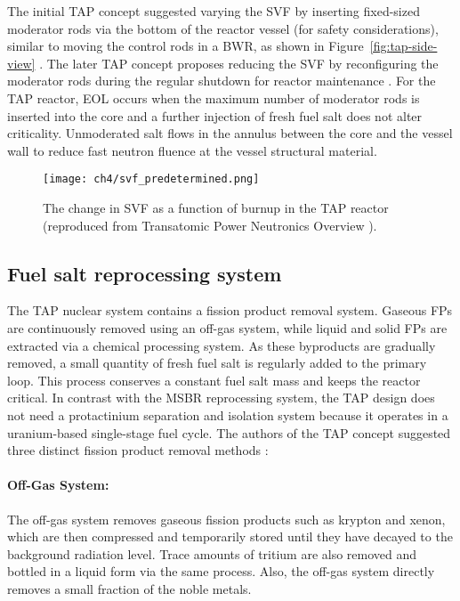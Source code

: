 The initial \gls{TAP} concept suggested varying the \gls{SVF} by inserting 
fixed-sized moderator rods via the bottom of the reactor vessel (for safety 
considerations), similar to moving the control rods in a \gls{BWR}, as shown 
in Figure~\ref{fig:tap-side-view} 
\cite{transatomic_power_corporation_neutronics_2016}. The later \gls{TAP} 
concept proposes reducing the \gls{SVF} by reconfiguring the moderator rods 
during the regular shutdown for reactor maintenance 
\cite{betzler_assessment_2017-1}. For the \gls{TAP} reactor, \gls{EOL} occurs 
when the maximum number of moderator rods is inserted into the core and a 
further injection of fresh fuel salt does not alter criticality. Unmoderated 
salt flows in the annulus between the core and the vessel wall to reduce fast 
neutron fluence at the vessel structural material.
\begin{figure}[t] %
	\texttt{[image: ch4/svf\_predetermined.png]}
	\caption{The change in SVF as a function of burnup in the \gls{TAP} 
	reactor (reproduced from Transatomic Power Neutronics Overview  
	\cite{transatomic_power_corporation_neutronics_2016}).}
	\label{fig:svf-predetermined}
\end{figure}


\subsection{Fuel salt reprocessing system}
The \gls{TAP} nuclear system contains a fission product removal system. 
Gaseous \glspl{FP} are continuously removed using an off-gas system, while 
liquid and solid \glspl{FP} are extracted via a chemical processing system. As 
these byproducts are gradually removed, a small quantity of fresh fuel salt is 
regularly added to the primary loop. This process conserves a constant fuel 
salt mass and keeps the reactor critical. In contrast with the \gls{MSBR} 
reprocessing system, the \gls{TAP} design does not need a protactinium 
separation and isolation system because it operates in a uranium-based 
single-stage fuel cycle. The authors of the \gls{TAP} concept suggested three 
distinct fission product removal methods 
\cite{transatomic_power_corporation_neutronics_2016}:
\paragraph*{Off-Gas System:} The off-gas system removes gaseous fission 
products such as krypton and xenon, which are then compressed and temporarily 
stored until they have decayed to the background radiation level. Trace 
amounts of tritium are also removed and bottled in a liquid form via the same 
process. Also, the off-gas system directly removes a small fraction of the 
noble metals.
